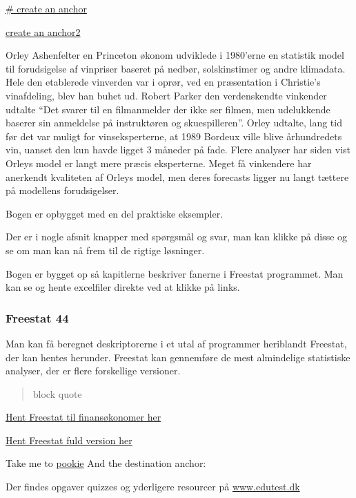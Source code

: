 \documentclass[]{book}
\theoremstyle{definition}
\theoremstyle{definition}
\theoremstyle{definition}
\theoremstyle{remark}
\begin{document}
\protect\hyperlink{anchors-in-markdown}{\# create an anchor}

\protect\hyperlink{anchors-in-markdown2}{create an anchor2}

 Orley Ashenfelter en Princeton økonom udviklede i 1980'erne en
statistik model til forudsigelse af vinpriser baseret på nedbør,
solskinstimer og andre klimadata. Hele den etablerede vinverden var i
oprør, ved en præsentation i Christie's vinafdeling, blev han buhet ud.
Robert Parker den verdenskendte vinkender udtalte ``Det svarer til en
filmanmelder der ikke ser filmen, men udelukkende baserer sin anmeldelse
på instruktøren og skuespilleren''. Orley udtalte, lang tid før det var
muligt for vinseksperterne, at 1989 Bordeux ville blive århundredets
vin, uanset den kun havde ligget 3 måneder på fade. Flere analyser har
siden vist Orleys model er langt mere præcis eksperterne. Meget få
vinkendere har anerkendt kvaliteten af Orleys model, men deres forecasts
ligger nu langt tættere på modellens forudsigelser.

Bogen er opbygget med en del praktiske eksempler.

Der er i nogle afsnit knapper med spørgsmål og svar, man kan klikke på
disse og se om man kan nå frem til de rigtige løsninger.

Bogen er bygget op så kapitlerne beskriver fanerne i Freestat
programmet. Man kan se og hente excelfiler direkte ved at klikke på
links.

\hypertarget{freestat-44}{%
\subsubsection{Freestat 44}\label{freestat-44}}

Man kan få beregnet deskriptorerne i et utal af programmer heriblandt
Freestat, der kan hentes herunder. Freestat kan gennemføre de mest
almindelige statistiske analyser, der er flere forskellige versioner.

\begin{quote}
block quote
\end{quote}

\href{https://www.dropbox.com/s/a2jztexbxfzcli0/FREESTAT.xlsx?dl=1}{Hent
Freestat til finansøkonomer her}

\href{https://www.dropbox.com/s/th8q95lf864npie/FREESTATfin.xlsx?dl=1}{Hent
Freestat fuld version her}

Take me to \protect\hyperlink{pookie}{pookie} And the destination
anchor:

Der findes opgaver quizzes og yderligere resourcer på
\href{http://www.edutest.dk}{www.edutest.dk}
\end{document}
